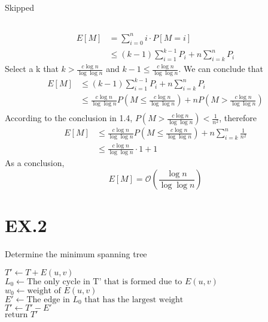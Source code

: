 \documentclass[12pt,a4paper]{article}
\theoremstyle{definition}
\begin{document}
\subsection{}
	Skipped
\subsection{}
	\begin{align*}
		E[M] &= \sum_{i=0}^n i\cdot P[M=i] \\
			& \leq (k-1)\sum_{i=1}^{k-1} P_i + n \sum_{i=k}^n P_i 
	\end{align*}
	Select a k that $k > \frac{c \log{n}}{\log{\log{n}}}$ and $k-1 \leq \frac{c \log{n}}{\log{\log{n}}}$. We can conclude that
	\begin{align*}
		E[M] & \leq (k-1)\sum_{i=1}^{k-1} P_i + n \sum_{i=k}^n P_i  \\
			& \leq \frac{c \log{n}}{\log{\log{n}}} P(M \leq \frac{c \log{n}}{\log{\log{n}}}) + n P(M>\frac{c \log{n}}{\log{\log{n}}})\\
	\end{align*}
	According to the conclusion in 1.4, $P(M>\frac{c \log{n}}{\log{\log{n}}}) < \frac{1}{n^2}$, therefore
	\begin{align*}
	E[M] &\leq \frac{c \log{n}}{\log{\log{n}}} P(M \leq \frac{c \log{n}}{\log{\log{n}}}) + n \sum_{i=k}^n \frac{1}{n^2} \\
	& \leq \frac{c \log{n}}{\log{\log{n}}}\cdot 1+ 1
	\end{align*}
	As a conclusion,
	$$
		E[M] = \mathcal{O}(\frac{\log{n}}{\log{\log{n}}})
	$$
\section{EX.2}
\begin{algorithm}[H]
	\BlankLine
	\caption{Determine the minimum spanning tree}\label{mst}
	\BlankLine
	$T' \gets T+E(u,v)$\\
	$L_0 \gets \text{The only cycle in T' that is formed due to }E(u,v)$\\
	$w_0 \gets \text{weight of }E(u,v)$\\
	$E' \gets \text{The edge in } L_0 \text{ that has the largest weight}$\\
	$T' \gets T'-E'$\\
	$\text{return } T'$
\end{algorithm}
\end{document}
